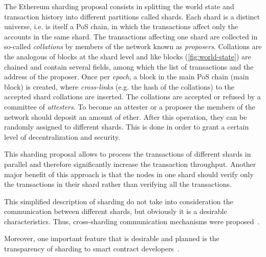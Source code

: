The Ethereum sharding proposal consists in splitting the world state and
transaction history into different partitions called shards. Each shard is a
distinct universe, i.e. is itself a PoS chain, in which the transactions affect
only the accounts in the same shard. The transactions affecting one shard are
collected in so-called \emph{collations} by members of the network known as
\emph{proposers}. Collations are the analogous of blocks at the shard level and
like blocks (\autoref{fig:world-state}) are chained and contain several fields,
among which the list of transactions and the address of the proposer. Once per
\emph{epoch}, a block in the main PoS chain (main block) is created, where
\emph{cross-links} (e.g. the hash of the collations) to the accepted shard
collations are inserted. The collations are accepted or refused by a committee
of \emph{attesters}. To become an attester or a proposer the members of the
network should deposit an amount of ether. After this operation, they can be
randomly assigned to different shards. This is done in order to grant a certain
level of decentralization and security.

This sharding proposal allows to process the transactions of different shards in
parallel and therefore significantly increase the transaction throughput.
Another major benefit of this approach is that the nodes in one shard should
verify only the transactions in their shard rather than verifying all the
transactions.

This simplified description of sharding do not take into consideration the
communication between different shards, but obviously it is a desirable
characteristics. Thus, cross-sharding communication mechanisms were
proposed~\cite{bib:sharding-faq}.

Moreover, one important feature that is desirable and planned is the
transparency of sharding to smart contract developers~\cite{bib:sharding-faq}.
